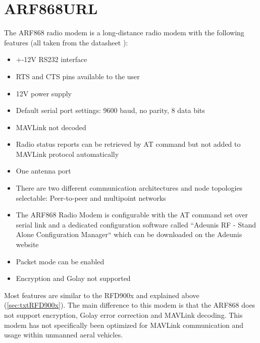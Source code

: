 \section{ARF868URL}
The ARF868 radio modem is a long-distance radio modem with the following features (all taken from the datasheet \cite{ARF_Datasheet}): \begin{itemize}
    \item +-12V RS232 interface
    \item RTS and CTS pins available to the user
    \item 12V power supply
    \item Default serial port settings: 9600 baud, no parity, 8 data bits
    \item MAVLink not decoded
    \item Radio status reports can be retrieved by AT command but not added to MAVLink protocol automatically
    \item One antenna port
    \item There are two different communication architectures and node topologies selectable: Peer-to-peer and multipoint networks
    \item The ARF868 Radio Modem is configurable with the AT command set over serial link and a dedicated configuration software called ``Adeunis RF - Stand Alone Configuration Manager`` which can be downloaded on the Adeunis website
    \item Packet mode can be enabled
    \item Encryption and Golay not supported
\end{itemize}
Most features are similar to the RFD900x and explained above (\autoref{sec:txtRFD900x}). The main difference to this modem is that the ARF868 does not support encryption, Golay error correction and MAVLink decoding. This modem has not specifically been optimized for MAVLink communication and usage within unmanned aeral vehicles.\\
%
%
